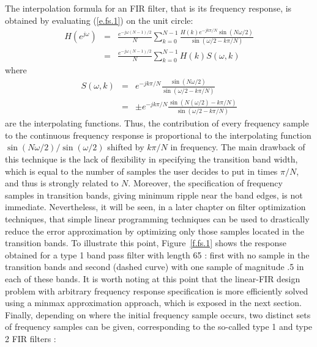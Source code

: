 	The interpolation formula for an FIR filter, that is its frequency response, is obtained by evaluating (\ref{e.fs.1}) on the unit circle:
\begin{eqnarray}
H(e^{j\omega}) &=& \frac{e^{-j\omega(N-1)/2}}{N}\sum_{k=0}^{N-1}\frac{H(k)e^{-jk\pi/N}\sin(N\omega/2)}{\sin(\omega/2-k\pi/N)}\nonumber\\
&=& \frac{e^{-j\omega(N-1)/2}}{N}\sum_{k=0}^{N-1}H(k)S(\omega,k)
\end{eqnarray}
where
\begin{eqnarray}
S(\omega,k) &=& e^{-jk\pi/N}\frac{\sin(N\omega/2)}{\sin(\omega/2-k\pi/N)}\nonumber\\
&=&\pm e^{-jk\pi/N}\frac{\sin(N(\omega/2)-k\pi/N)}{\sin(\omega/2-k\pi/N)}
\end{eqnarray}
are the interpolating functions.
Thus, the contribution of every frequency sample to the continuous
frequency response is proportional to the interpolating function
$\sin(N\omega/2)/\sin(\omega/2)$
shifted by \(k\pi/N\) in frequency.
	The main drawback of this technique is the lack of flexibility
in specifying the transition band width, which is equal to the number of samples the user decides to put in times \(\pi/N\), and thus is 
strongly related to $N$.
Moreover, the specification of frequency samples in transition bands, giving minimum ripple near the band edges, is not immediate.
Nevertheless, it will be seen, in a later chapter on filter optimization
techniques, that simple linear programming techniques can be used to drastically reduce the error approximation by optimizing only those samples located in the transition bands. To illustrate this point, Figure~\ref{f.fs.1} shows the response obtained for a type 1 band pass filter with length 65 : 
first with no sample in the transition bands and second (dashed curve) with one sample 
of magnitude .5 in each of these bands. It is worth noting at this point 
that the linear-FIR design problem with arbitrary frequency response 
specification is more efficiently solved using a minmax approximation 
approach, which is exposed in the next section. \\

Finally, depending on where the initial frequency sample occurs, two distinct sets of frequency samples can be given, corresponding to the so-called
 type 1 and type 2 FIR filters :\\
